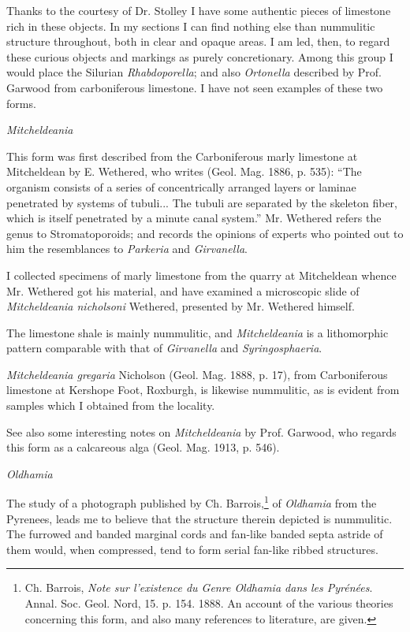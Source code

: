 \documentclass[a4paper, 12pt, oneside]{article}
\begin{document}
Thanks to the courtesy of Dr. Stolley I have some authentic pieces of limestone rich in these objects. In my sections I can find nothing else than nummulitic structure throughout, both in clear and opaque areas. I am led, then, to regard these curious objects and markings as purely concretionary. Among this group I would place the Silurian \emph{Rhabdoporella}; and also \emph{Ortonella} described by Prof. Garwood from carboniferous limestone. I have not seen examples of these two forms.

\emph{Mitcheldeania}

This form was first described from the Carboniferous marly limestone at Mitcheldean by E. Wethered, who writes (Geol. Mag. 1886, p. 535): ``The organism consists of a series of concentrically arranged layers or laminae penetrated by systems of tubuli... The tubuli are separated by the skeleton fiber, which is itself penetrated by a minute canal system.'' Mr. Wethered refers the genus to Stromatoporoids; and records the opinions of experts who pointed out to him the resemblances to \emph{Parkeria} and \emph{Girvanella}.

I collected specimens of marly limestone from the quarry at Mitcheldean whence Mr. Wethered got his material, and have examined a microscopic slide of \emph{Mitcheldeania nicholsoni} Wethered, presented by Mr. Wethered himself.

The limestone shale is mainly nummulitic, and \emph{Mitcheldeania} is a lithomorphic pattern comparable with that of \emph{Girvanella} and \emph{Syringosphaeria}.

\emph{Mitcheldeania gregaria} Nicholson (Geol. Mag. 1888, p. 17), from Carboniferous limestone at Kershope Foot, Roxburgh, is likewise nummulitic, as is evident from samples which I obtained from the locality.

See also some interesting notes on \emph{Mitcheldeania} by Prof. Garwood, who regards this form as a calcareous alga (Geol. Mag. 1913, p. 546).

\emph{Oldhamia}

The study of a photograph published by Ch. Barrois,\footnote{Ch. Barrois, \emph{Note sur l'existence du Genre \emph{Oldhamia} dans les Pyrénées}. Annal. Soc. Geol. Nord, 15. p. 154. 1888. An account of the various theories concerning this form, and also many references to literature, are given.} of \emph{Oldhamia} from the Pyrenees, leads me to believe that the structure therein depicted is nummulitic. The furrowed and banded marginal cords and fan-like banded septa astride of them would, when compressed, tend to form serial fan-like ribbed structures.
\end{document}
